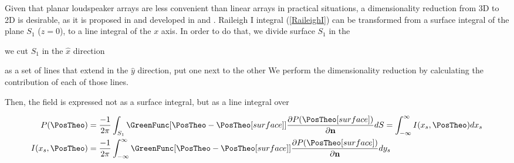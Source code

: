Given that planar loudspeaker arrays are less convenient than linear arrays in practical situations, a dimensionality reduction from 3D to 2D is desirable, as it is proposed in \cite{Vogel} and developed in \cite{Start1997} and  \cite{Verheijen}.
Raileigh I integral (\autoref{RaileighI}) can be transformed from a surface integral of the plane $S_1$ ($z=0$), to a line integral of the $x$ axis. In order to do that, we divide surface $S_1$ in the 

we cut $S_1$ in the $\hat{x}$ direction

as a set of lines that extend in the $\hat{y}$ direction, put one next to the other We perform the dimensionality reduction by calculating the contribution of each of those lines.

Then, the field is expressed not as a surface integral, but as a line integral over

\begin{equation}
\begin{aligned}
P(\PosTheo) &= \frac{-1}{2\pi} \int_{S_1} \GreenFunc[{\PosTheo - \PosTheo[surface]}] \frac{\partial P(\PosTheo[surface])}{\partial \mathbf{n}} dS = \int_{-\infty}^{\infty} I(x_s, \PosTheo) dx_s \\
I(x_s, \PosTheo) &= \frac{-1}{2\pi} \int_{-\infty}^{\infty} \GreenFunc[{\PosTheo - \PosTheo[surface]}] \frac{\partial P(\PosTheo[surface])}{\partial \mathbf{n}} dy_s
\end{aligned}
\label{LineIntegral}
\end{equation}

